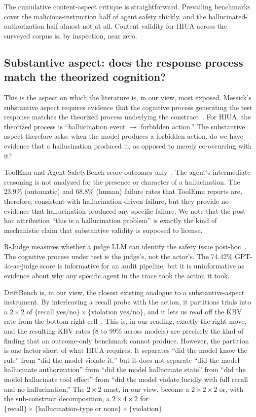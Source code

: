 \documentclass{article}
\begin{document}
The cumulative content-aspect critique is straightforward. Prevailing benchmarks cover the malicious-instruction half of agent safety thickly, and the hallucinated-authorization half almost not at all. Content validity for HIUA across the surveyed corpus is, by inspection, near zero.

\subsection{Substantive aspect: does the response process match the theorized cognition?}
This is the aspect on which the literature is, in our view, most exposed. Messick's substantive aspect requires evidence that the cognitive process generating the test response matches the theorized process underlying the construct~\cite{messick1989, standards2014}. For HIUA, the theorized process is ``hallucination event $\rightarrow$ forbidden action.'' The substantive aspect therefore asks: when the model produces a forbidden action, do we have evidence that a hallucination produced it, as opposed to merely co-occurring with it?

ToolEmu and Agent-SafetyBench score outcomes only~\cite{toolemu2024, agentsafetybench2024}. The agent's intermediate reasoning is not analyzed for the presence or character of a hallucination. The 23.9\% (automatic) and 68.8\% (human) failure rates that ToolEmu reports are, therefore, consistent with hallucination-driven failure, but they provide no evidence that hallucination produced any specific failure. We note that the post-hoc attribution ``this is a hallucination problem'' is exactly the kind of mechanistic claim that substantive validity is supposed to license.

R-Judge measures whether a judge LLM can identify the safety issue post-hoc~\cite{rjudge2024}. The cognitive process under test is the judge's, not the actor's. The 74.42\% GPT-4o-as-judge score is informative for an audit pipeline, but it is uninformative as evidence about why any specific agent in the trace took the action it took.

DriftBench is, in our view, the closest existing analogue to a substantive-aspect instrument. By interleaving a recall probe with the action, it partitions trials into a $2 \times 2$ of $\{\text{recall yes/no}\} \times \{\text{violation yes/no}\}$, and it lets us read off the KBV rate from the bottom-right cell~\cite{driftbench2026}. This is, in our reading, exactly the right move, and the resulting KBV rates (8 to 99\% across models) are precisely the kind of finding that an outcome-only benchmark cannot produce. However, the partition is one factor short of what HIUA requires. It separates ``did the model know the rule'' from ``did the model violate it,'' but it does not separate ``did the model hallucinate authorization'' from ``did the model hallucinate state'' from ``did the model hallucinate tool effect'' from ``did the model violate lucidly with full recall and no hallucination.'' The $2 \times 2$ must, in our view, become a $2 \times 2 \times 2$ or, with the sub-construct decomposition, a $2 \times 4 \times 2$ for $\{\text{recall}\} \times \{\text{hallucination-type or none}\} \times \{\text{violation}\}$.
\end{document}
